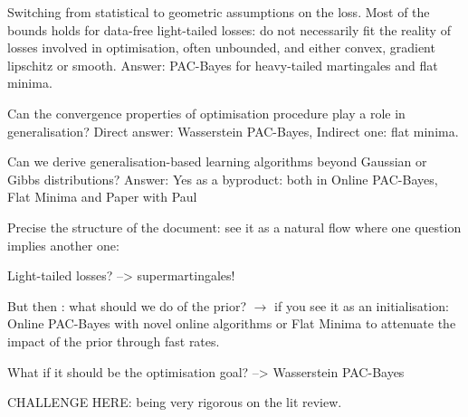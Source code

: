 Switching from statistical to geometric assumptions on the loss. Most of the bounds holds for data-free light-tailed losses: do not necessarily fit the reality of losses involved in optimisation, often unbounded, and either convex, gradient lipschitz or smooth. Answer: PAC-Bayes for heavy-tailed martingales and flat minima.

Can the convergence properties of optimisation procedure play a role in generalisation? Direct answer: Wasserstein PAC-Bayes, Indirect one: flat minima. 

Can we derive generalisation-based learning algorithms beyond Gaussian or Gibbs distributions? Answer: Yes as a byproduct: both in Online PAC-Bayes, Flat Minima and Paper with Paul  

Precise the structure of the document: see it as a natural flow where one question implies another one: 

Light-tailed losses? --> supermartingales! 

But then : what should we do of the prior? $\rightarrow$  if you see it as an initialisation: Online PAC-Bayes with novel online algorithms or Flat Minima to attenuate the impact of the prior through fast rates.

What if it should be the optimisation goal? --> Wasserstein PAC-Bayes



 


CHALLENGE HERE: being very rigorous on the lit review.
